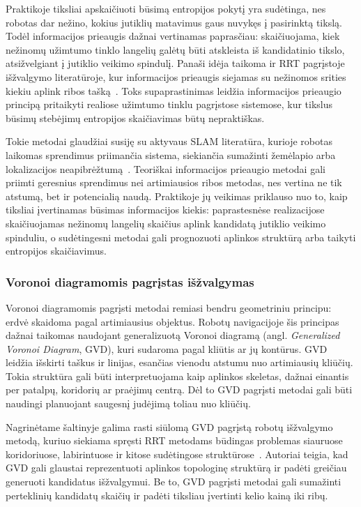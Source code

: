 \documentclass[]{VUMIFTemplateClass}
\begin{document}
Praktikoje tiksliai apskaičiuoti būsimą entropijos pokytį yra sudėtinga, nes robotas dar nežino, kokius jutiklių matavimus gaus nuvykęs į pasirinktą tikslą.
Todėl informacijos prieaugis dažnai vertinamas paprasčiau: skaičiuojama, kiek nežinomų užimtumo tinklo langelių galėtų būti atskleista iš kandidatinio tikslo,
atsižvelgiant į jutiklio veikimo spindulį. Panaši idėja taikoma ir RRT pagrįstoje išžvalgymo literatūroje, kur informacijos prieaugis siejamas su nežinomos
srities kiekiu aplink ribos tašką~\cite{umari2017rrt}. Toks supaprastinimas leidžia informacijos prieaugio principą pritaikyti realiose užimtumo tinklu
pagrįstose sistemose, kur tikslus būsimų stebėjimų entropijos skaičiavimas būtų nepraktiškas.
                                                                                                                                                                
Tokie metodai glaudžiai susiję su aktyvaus SLAM literatūra, kurioje robotas laikomas sprendimus priimančia sistema, siekiančia sumažinti žemėlapio arba        
lokalizacijos neapibrėžtumą~\cite{placed2023activeslam}. Teoriškai informacijos prieaugio metodai gali priimti geresnius sprendimus nei artimiausios ribos     
metodas, nes vertina ne tik atstumą, bet ir potencialią naudą. Praktikoje jų veikimas priklauso nuo to, kaip tiksliai įvertinamas būsimas informacijos kiekis: 
paprastesnėse realizacijose skaičiuojamas nežinomų langelių skaičius aplink kandidatą jutiklio veikimo spinduliu, o sudėtingesni metodai gali prognozuoti      
aplinkos struktūrą arba taikyti entropijos skaičiavimus. 

\subsubsection{Voronoi diagramomis pagrįstas išžvalgymas}

Voronoi diagramomis pagrįsti metodai remiasi bendru geometriniu principu: erdvė skaidoma pagal artimiausius objektus. Robotų navigacijoje šis principas dažnai
taikomas naudojant generalizuotą Voronoi diagramą (angl. \textit{Generalized Voronoi Diagram}, GVD), kuri sudaroma pagal kliūtis ar jų kontūrus. GVD leidžia
išskirti taškus ir linijas, esančias vienodu atstumu nuo artimiausių kliūčių. Tokia struktūra gali būti interpretuojama kaip aplinkos skeletas, dažnai einantis
per patalpų, koridorių ar praėjimų centrą. Dėl to GVD pagrįsti
metodai gali būti naudingi planuojant saugesnį judėjimą toliau nuo kliūčių.

Nagrinėtame šaltinyje galima rasti siūlomą GVD pagrįstą robotų išžvalgymo metodą, kuriuo siekiama spręsti RRT metodams būdingas problemas siauruose koridoriuose, labirintuose ir
kitose sudėtingose struktūrose~\cite{chen2022gvd}. Autoriai teigia, kad GVD gali glaustai reprezentuoti aplinkos topologinę struktūrą ir padėti greičiau
generuoti kandidatus išžvalgymui. Be to, GVD pagrįsti metodai gali sumažinti perteklinių kandidatų skaičių ir padėti tiksliau įvertinti kelio kainą iki
ribų.
\end{document}
